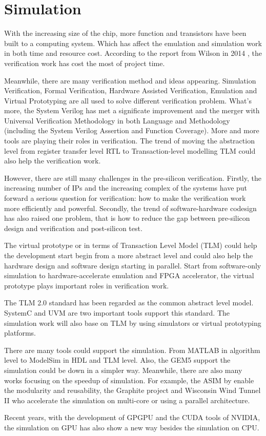 \section{Simulation}
\par With the increasing size of the chip, more function and transistors have been built to a computing system. Which has affect the emulation and simulation work in both time and resource cost. According to the report from Wilson in 2014 \cite{Foster2014WRGReport}, the verification work has cost the most of project time. 
\par Meanwhile, there are many verification method and ideas appearing. Simulation Verification, Formal Verification, Hardware Assisted Verification, Emulation and Virtual Prototyping are all used to solve different verification problem. What's more, the System Verilog has met a significate improvement and the merger with Universal Verification Methodology in both Language and Methodology (including the System Verilog Assertion and Function Coverage). More and more tools are playing their roles in verification. The trend of moving the abstraction level from register transfer level RTL to Transaction-level modelling TLM could also help the verification work. 
\par However, there are still many challenges in the pre-silicon verification. Firstly, the increasing number of IPs and the increasing complex of the systems have put forward a serious question for verification: how to make the verification work more efficiently and powerful. Secondly, the trend of software-hardware codesign has also raised one problem, that is how to reduce the gap between pre-silicon design and verification and post-silicon test. 
\par The virtual prototype or in terms of Transaction Level Model (TLM) could help the development start begin from a more abstract level and could also help the hardware design and software design starting in parallel. Start from software-only simulation to hardware-accelerate emulation and FPGA accelerator, the virtual prototype plays important roles in verification work.
\par The TLM 2.0 standard has been regarded as the common abstract level model. SystemC and UVM are two important tools support this standard. The simulation work will also base on TLM by using simulators or virtual prototyping platforms.
\par There are many tools could support the simulation. From MATLAB in algorithm level to ModelSim in HDL and TLM level. Also, the GEM5 support the simulation could be down in a simpler way\cite{binkert2011gem5}. Meanwhile, there are also many works focusing on the speedup of simulation. For example, the ASIM\cite{emer2002asim} by enable the modularity and reusability, the Graphite\cite{miller2010graphite} project and Wisconsin Wind Tunnel II\cite{mukherjee2000wisconsin} who accelerate the simulation on multi-core or using a parallel architecture.
\par Recent years, with the development of GPGPU and the CUDA tools of NVIDIA, the simulation on GPU has also show a new way besides the simulation on CPU\cite{bombieri2012systemc}\cite{nanjundappa2012accelerating}\cite{schmidt2017hybrid}\cite{ventroux2014highly}\cite{vinco2012saga}\cite{weinstock2016systemc}.
